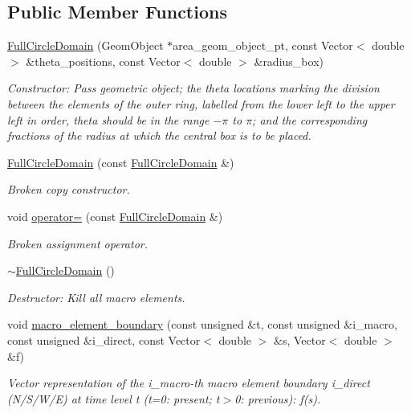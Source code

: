 \subsection*{Public Member Functions}
\begin{DoxyCompactItemize}
\item 
\hyperlink{classoomph_1_1FullCircleDomain_a35697cff7683dde517a2b8cf912a6aac}{Full\+Circle\+Domain} (Geom\+Object $\ast$area\+\_\+geom\+\_\+object\+\_\+pt, const Vector$<$ double $>$ \&theta\+\_\+positions, const Vector$<$ double $>$ \&radius\+\_\+box)
\begin{DoxyCompactList}\small\item\em Constructor\+: Pass geometric object; the theta locations marking the division between the elements of the outer ring, labelled from the lower left to the upper left in order, theta should be in the range $-\pi$ to $\pi$; and the corresponding fractions of the radius at which the central box is to be placed. \end{DoxyCompactList}\item 
\hyperlink{classoomph_1_1FullCircleDomain_a36c2bdc01a19f511c97a89f87cd5b7dc}{Full\+Circle\+Domain} (const \hyperlink{classoomph_1_1FullCircleDomain}{Full\+Circle\+Domain} \&)
\begin{DoxyCompactList}\small\item\em Broken copy constructor. \end{DoxyCompactList}\item 
void \hyperlink{classoomph_1_1FullCircleDomain_a9293b7e09e37a9bc3cc4e495e6a22587}{operator=} (const \hyperlink{classoomph_1_1FullCircleDomain}{Full\+Circle\+Domain} \&)
\begin{DoxyCompactList}\small\item\em Broken assignment operator. \end{DoxyCompactList}\item 
\hyperlink{classoomph_1_1FullCircleDomain_afbdae044de6d958491a0b1a8cfcbc175}{$\sim$\+Full\+Circle\+Domain} ()
\begin{DoxyCompactList}\small\item\em Destructor\+: Kill all macro elements. \end{DoxyCompactList}\item 
void \hyperlink{classoomph_1_1FullCircleDomain_a93253d6c878c3ab40a582e0d2070a69d}{macro\+\_\+element\+\_\+boundary} (const unsigned \&t, const unsigned \&i\+\_\+macro, const unsigned \&i\+\_\+direct, const Vector$<$ double $>$ \&s, Vector$<$ double $>$ \&f)
\begin{DoxyCompactList}\small\item\em Vector representation of the i\+\_\+macro-\/th macro element boundary i\+\_\+direct (N/\+S/\+W/E) at time level t (t=0\+: present; t$>$0\+: previous)\+: f(s). \end{DoxyCompactList}\end{DoxyCompactItemize}
